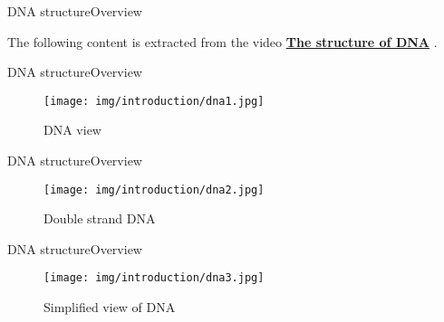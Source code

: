 \documentclass[10pt]{beamer}
\newcommand{\1}{
	\setbeamertemplate{background}{
		\texttt{[image: img/1]}
		\tikz[overlay] \fill[fill opacity=0.75,fill=white] (0,0) rectangle (-\paperwidth,\paperheight);
	}
}
\begin{document}
\begin{frame}{DNA structure}{Overview}

\begin{block}{}
The following content is extracted from the video \href{https://www.youtube.com/watch?v=o_-6JXLYS-k}{\textbf{The structure of DNA}} \cite{yourgenome2020}.
\end{block}

\end{frame}

\begin{frame}{DNA structure}{Overview}
	\begin{figure}[]
		\centering
		\texttt{[image: img/introduction/dna1.jpg]}
		\label{img:mot2}
		\caption{DNA view}
	\end{figure}
\end{frame}

\begin{frame}{DNA structure}{Overview}
	\begin{figure}[]
		\centering
		\texttt{[image: img/introduction/dna2.jpg]}
		\label{img:mot2}
		\caption{Double strand DNA}
	\end{figure}
\end{frame}

\begin{frame}{DNA structure}{Overview}
	\begin{figure}[]
		\centering
		\texttt{[image: img/introduction/dna3.jpg]}
		\label{img:mot2}
		\caption{Simplified view of DNA}
	\end{figure}
\end{frame}
\end{document}
